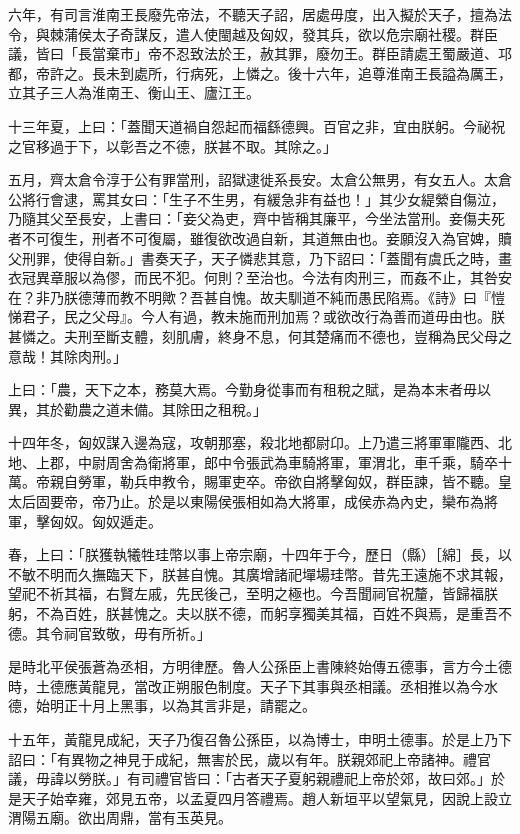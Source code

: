 \begin{pinyinscope}
六年，有司言淮南王長廢先帝法，不聽天子詔，居處毋度，出入擬於天子，擅為法令，與棘蒲侯太子奇謀反，遣人使閩越及匈奴，發其兵，欲以危宗廟社稷。群臣議，皆曰「長當棄市」帝不忍致法於王，赦其罪，廢勿王。群臣請處王蜀嚴道、邛都，帝許之。長未到處所，行病死，上憐之。後十六年，追尊淮南王長謚為厲王，立其子三人為淮南王、衡山王、廬江王。

十三年夏，上曰：「蓋聞天道禍自怨起而福繇德興。百官之非，宜由朕躬。今祕祝之官移過于下，以彰吾之不德，朕甚不取。其除之。」

五月，齊太倉令淳于公有罪當刑，詔獄逮徙系長安。太倉公無男，有女五人。太倉公將行會逮，罵其女曰：「生子不生男，有緩急非有益也！」其少女緹縈自傷泣，乃隨其父至長安，上書曰：「妾父為吏，齊中皆稱其廉平，今坐法當刑。妾傷夫死者不可復生，刑者不可復屬，雖復欲改過自新，其道無由也。妾願沒入為官婢，贖父刑罪，使得自新。」書奏天子，天子憐悲其意，乃下詔曰：「蓋聞有虞氏之時，畫衣冠異章服以為僇，而民不犯。何則？至治也。今法有肉刑三，而姦不止，其咎安在？非乃朕德薄而教不明歟？吾甚自愧。故夫馴道不純而愚民陷焉。《詩》曰『愷悌君子，民之父母』。今人有過，教未施而刑加焉？或欲改行為善而道毋由也。朕甚憐之。夫刑至斷支體，刻肌膚，終身不息，何其楚痛而不德也，豈稱為民父母之意哉！其除肉刑。」

上曰：「農，天下之本，務莫大焉。今勤身從事而有租稅之賦，是為本末者毋以異，其於勸農之道未備。其除田之租稅。」

十四年冬，匈奴謀入邊為寇，攻朝那塞，殺北地都尉卬。上乃遣三將軍軍隴西、北地、上郡，中尉周舍為衛將軍，郎中令張武為車騎將軍，軍渭北，車千乘，騎卒十萬。帝親自勞軍，勒兵申教令，賜軍吏卒。帝欲自將擊匈奴，群臣諫，皆不聽。皇太后固要帝，帝乃止。於是以東陽侯張相如為大將軍，成侯赤為內史，欒布為將軍，擊匈奴。匈奴遁走。

春，上曰：「朕獲執犧牲珪幣以事上帝宗廟，十四年于今，歷日（縣）［綿］長，以不敏不明而久撫臨天下，朕甚自愧。其廣增諸祀墠場珪幣。昔先王遠施不求其報，望祀不祈其福，右賢左戚，先民後己，至明之極也。今吾聞祠官祝釐，皆歸福朕躬，不為百姓，朕甚愧之。夫以朕不德，而躬享獨美其福，百姓不與焉，是重吾不德。其令祠官致敬，毋有所祈。」

是時北平侯張蒼為丞相，方明律歷。魯人公孫臣上書陳終始傳五德事，言方今土德時，土德應黃龍見，當改正朔服色制度。天子下其事與丞相議。丞相推以為今水德，始明正十月上黑事，以為其言非是，請罷之。

十五年，黃龍見成紀，天子乃復召魯公孫臣，以為博士，申明土德事。於是上乃下詔曰：「有異物之神見于成紀，無害於民，歲以有年。朕親郊祀上帝諸神。禮官議，毋諱以勞朕。」有司禮官皆曰：「古者天子夏躬親禮祀上帝於郊，故曰郊。」於是天子始幸雍，郊見五帝，以孟夏四月答禮焉。趙人新垣平以望氣見，因說上設立渭陽五廟。欲出周鼎，當有玉英見。


\end{pinyinscope}
